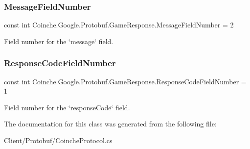 \subsubsection{\texorpdfstring{Message\+Field\+Number}{MessageFieldNumber}}
{\footnotesize\ttfamily const int Coinche.\+Google.\+Protobuf.\+Game\+Response.\+Message\+Field\+Number = 2}



Field number for the \char`\"{}message\char`\"{} field.

\mbox{\label{class_coinche_1_1_google_1_1_protobuf_1_1_game_response_ad5b1a7826d766552e707f2c2718c2b21}} 
\subsubsection{\texorpdfstring{Response\+Code\+Field\+Number}{ResponseCodeFieldNumber}}
{\footnotesize\ttfamily const int Coinche.\+Google.\+Protobuf.\+Game\+Response.\+Response\+Code\+Field\+Number = 1}



Field number for the \char`\"{}response\+Code\char`\"{} field.



The documentation for this class was generated from the following file\+:\begin{DoxyCompactItemize}
\item 
Client/\+Protobuf/Coinche\+Protocol.\+cs\end{DoxyCompactItemize}
